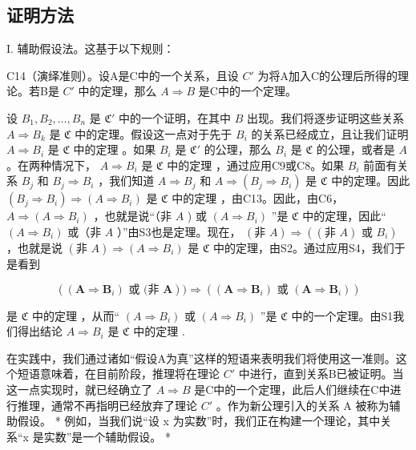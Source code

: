 \subsection{证明方法}

I. 辅助假设法。这基于以下规则：

C14（演绎准则）。设A是C中的一个关系，且设 \(C'\) 为将A加入C的公理后所得的理论。若B是 \(C'\) 中的定理，那么 \(A \Longrightarrow B\) 是C中的一个定理。

设 \(B_1, B_2, \ldots, B_n\) 是 \(\mathfrak{C}'\) 中的一个证明，在其中 \(B\) 出现。我们将逐步证明这些关系 \(A \Longrightarrow B_k\) 是 \(\mathfrak{C}\) 中的定理。假设这一点对于先于 \(B_i\) 的关系已经成立，且让我们证明 \(A \Longrightarrow B_i\) 是 \(\mathfrak{C}\) 中的定理 。如果 \(B_i\) 是 \(\mathfrak{C}'\) 的公理，那么 \(B_i\) 是 \(\mathfrak{C}\) 的公理，或者是 \(A\) 。在两种情况下， \(A \Longrightarrow B_i\) 是 \(\mathfrak{C}\) 中的定理 ，通过应用C9或C8。如果 \(B_i\) 前面有关系 \(B_j\) 和 \(B_j \Longrightarrow B_i\) ，我们知道 \(A \Longrightarrow B_j\) 和 \(A \Longrightarrow (B_j \Longrightarrow B_i)\) 是 \(\mathfrak{C}\) 中的定理。因此 \((B_j \Longrightarrow B_i) \Longrightarrow (A \Longrightarrow B_i)\) 是 \(\mathfrak{C}\) 中的定理 ，由C13。因此，由C6， \(A \Longrightarrow (A \Longrightarrow B_i)\) ，也就是说“（非 \(A\) ) 或 \((A \Longrightarrow B_i)\) ”是 \(\mathfrak{C}\) 中的定理，因此“ \((A \Longrightarrow B_i)\) 或（非 \(A\) ）”由S3也是定理。现在， \((\text{非 } A) \Longrightarrow ((\text{非 } A) \text{ 或 } B_i)\) ，也就是说 \((\text{非 } A) \Longrightarrow (A \Longrightarrow B_i)\) 是 \(\mathfrak{C}\) 中的定理，由S2。通过应用S4，我们于是看到

\[
((\mathbf {A} \Rightarrow \mathbf {B} _ {i}) \text {   或   (非   } \mathbf {A})) \Rightarrow ((\mathbf {A} \Rightarrow \mathbf {B} _ {i}) \text {   或   } (\mathbf {A} \Rightarrow \mathbf {B} _ {i}))
\]

是 \(\mathfrak{C}\) 中的定理 ，从而“ \((A \Longrightarrow B_i)\) 或 \((A \Longrightarrow B_i)\) ”是 \(\mathfrak{C}\) 中的一个定理。由S1我们得出结论 \(A \Longrightarrow B_i\) 是 \(\mathfrak{C}\) 中的定理 .

在实践中，我们通过诸如“假设A为真”这样的短语来表明我们将使用这一准则。这个短语意味着，在目前阶段，推理将在理论 \(C'\) 中进行，直到关系B已被证明。当这一点实现时，就已经确立了 \(A \Longrightarrow B\) 是C中的一个定理，此后人们继续在C中进行推理，通常不再指明已经放弃了理论 \(C'\) 。作为新公理引入的关系 A 被称为辅助假设。 * 例如，当我们说“设 x 为实数”时，我们正在构建一个理论，其中关系“x 是实数”是一个辅助假设。 *

